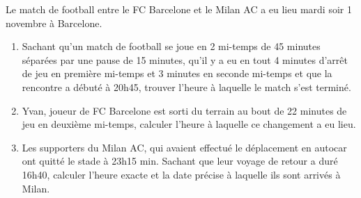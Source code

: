 
\begin{exercice}[Football]
Le match de football entre le FC Barcelone et le Milan AC a eu lieu mardi soir 1 novembre à Barcelone. 
\begin{enumerate}
 \item Sachant qu’un match de football se joue en 2 mi-temps de 45 minutes séparées par une pause de 15 minutes, qu’il y a eu en tout 4 minutes d’arrêt de jeu en première mi-temps et 3 minutes en seconde mi-temps et que la rencontre a débuté à 20h45, trouver l’heure à laquelle le match s’est terminé. 
 \item Yvan, joueur de FC Barcelone est sorti du terrain au bout de 22 minutes de jeu en deuxième mi-temps, calculer l’heure à laquelle ce changement a eu lieu.
 \item Les supporters du Milan AC, qui avaient effectué le déplacement en autocar ont quitté le stade à 23h15 min. Sachant que leur voyage de retour a duré 16h40, calculer l’heure exacte et la date précise à laquelle ils sont arrivés à Milan. 
 \end{enumerate}
\end{exercice}